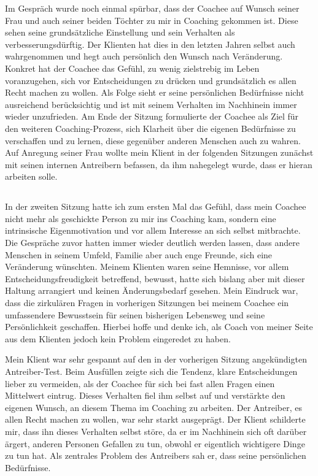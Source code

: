 \documentclass[11pt,a4paper]{article}
\begin{document}
Im Gespräch wurde noch einmal spürbar, dass der Coachee auf Wunsch seiner Frau und auch seiner beiden Töchter zu mir in Coaching gekommen ist. Diese sehen seine grundsätzliche Einstellung und sein Verhalten als verbesserungsdürftig. Der Klienten hat dies in den letzten Jahren selbst auch wahrgenommen und hegt auch persönlich den Wunsch nach Veränderung. Konkret hat der Coachee das Gefühl, zu wenig zielstrebig im Leben voranzugehen, sich vor Entscheidungen zu drücken und grundsätzlich es allen Recht machen zu wollen. Als Folge sieht er seine persönlichen Bedürfnisse nicht ausreichend berücksichtig und ist mit seinem Verhalten im Nachhinein immer wieder unzufrieden. Am Ende der Sitzung formulierte der Coachee als Ziel für den weiteren Coaching-Prozess, sich Klarheit über die eigenen Bedürfnisse zu verschaffen und zu lernen, diese gegenüber anderen Menschen auch zu wahren. Auf Anregung seiner Frau wollte mein Klient in der folgenden Sitzungen zunächst mit seinen internen Antreibern befassen, da ihm nahegelegt wurde, dass er hieran arbeiten solle.



\subsection*{\color{Orange}{Zweite Sitzung: Antreiber-Modell}}

In der zweiten Sitzung hatte ich zum ersten Mal das Gefühl, dass mein Coachee nicht mehr als geschickte Person zu mir ins Coaching kam, sondern eine intrinsische Eigenmotivation und vor allem Interesse an sich selbst mitbrachte. Die Gespräche zuvor hatten immer wieder deutlich werden lassen, dass andere Menschen in seinem Umfeld, Familie aber auch enge Freunde, sich eine Veränderung wünschten. Meinem Klienten waren seine Hemnisse, vor allem Entscheidungsfreudigkeit betreffend, bewusst, hatte sich bislang aber mit dieser Haltung arrangiert und keinen Änderungsbedarf gesehen. Mein Eindruck war, dass die zirkulären Fragen in vorherigen Sitzungen bei meinem Coachee ein umfassendere Bewusstsein für seinen bisherigen Lebensweg und seine Persönlichkeit geschaffen. Hierbei hoffe und denke ich, als Coach von meiner Seite aus dem Klienten jedoch kein Problem eingeredet zu haben. 

Mein Klient war sehr gespannt auf den in der vorherigen Sitzung angekündigten Antreiber-Test. Beim Ausfüllen zeigte sich die Tendenz, klare Entscheidungen lieber zu vermeiden, als der Coachee für sich bei fast allen Fragen einen Mittelwert eintrug. Dieses Verhalten fiel ihm selbst auf und verstärkte den eigenen Wunsch, an diesem Thema im Coaching zu arbeiten. Der Antreiber, es allen Recht machen zu wollen, war sehr starkt ausgeprägt. Der Klient schilderte mir, dass ihn dieses Verhalten selbst störe, da er im Nachhinein sich oft darüber ärgert, anderen Personen Gefallen zu tun, obwohl er eigentlich wichtigere Dinge zu tun hat. Als zentrales Problem des Antreibers sah er, dass seine persönlichen Bedürfnisse.
\end{document}

